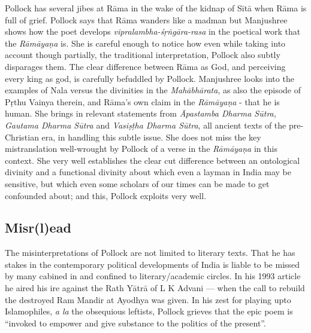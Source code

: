 Pollock has several jibes at Rāma in the wake of the kidnap of Sītā when Rāma is full of grief. Pollock says that Rāma wanders like a madman but Manjushree shows how the poet develops {\sl vipralambha-śṛṅgāra-rasa} in the poetical work that the {\sl Rāmāyaṇa} is. She is careful enough to notice how even while taking into account though partially, the traditional interpretation, Pollock also subtly disparages them. The clear difference between Rāma as God, and perceiving every king as god, is carefully befuddled by Pollock. Manjushree looks into the examples of Nala versus the divinities in the {\sl Mahābhārata}, as also the episode of Pṛthu Vainya therein, and Rāma's own claim in the {\sl Rāmāyaṇa} - that he is human. She brings in relevant statements from {\sl Āpastamba Dharma Sūtra, Gautama Dharma Sūtra} and {\sl Vasiṣṭha Dharma Sūtra}, all ancient texts of the pre-Christian era, in handling this subtle issue. She does not miss the key mistranslation well-wrought by Pollock of a verse in the {\sl Rāmāyaṇa} in this context. She very well establishes the clear cut difference between an ontological divinity and a functional divinity about which even a layman in India may be sensitive, but which even some scholars of our times can be made to get confounded about; and this, Pollock exploits very well.\\[-20pt]

\subsection*{Misr(l)ead}

The misinterpretations of Pollock are not limited to literary texts. That he has stakes in the contemporary political developments of India is liable to be missed by many cabined in and confined to literary/academic circles. In his 1993 article he aired his ire against the Rath Yātrā of L K Advani --- when the call to rebuild the destroyed Ram Mandir at Ayodhya was given. In his zest for playing upto Islamophiles, {\sl a la} the obsequious leftists, Pollock grieves that the epic poem is “invoked to empower and give substance to the politics of the present”.\\[-20pt]


